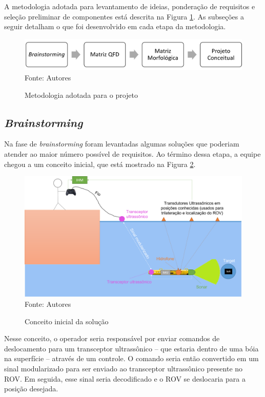 A metodologia adotada para levantamento de ideias, ponderação de requisitos e seleção preliminar de componentes está descrita na Figura \ref{fig:metodologia}. As subseções a seguir detalham o que foi desenvolvido em cada etapa da metodologia.

\begin{figure}[h]
	\centering
	\caption{Metodologia adotada para o projeto}
	\label{fig:metodologia}
	\includegraphics[width=0.7\linewidth]{images/metodologia}\\
	\footnotesize Fonte: Autores
\end{figure}

\subsection{\textit{Brainstorming}}
\label{subsec:brainstorming}

Na fase de \textit{brainstorming} foram levantadas algumas soluções que poderiam atender ao maior número possível de requisitos. Ao término dessa etapa, a equipe chegou a um conceito inicial, que está mostrado na Figura \ref{fig:conceito-inicial}.

\begin{figure}[h]
	\centering
	\caption{Conceito inicial da solução}
	\label{fig:conceito-inicial}
	\includegraphics[width=1\linewidth]{images/conceito-inicial}\\
	\footnotesize Fonte: Autores
\end{figure}

Nesse conceito, o operador seria responsável por enviar comandos de deslocamento para um transceptor ultrassônico -- que estaria dentro de uma bóia na superfície -- através de um controle. O comando seria então convertido em um sinal modularizado para ser enviado ao transceptor ultrassônico presente no ROV. Em seguida, esse sinal seria decodificado e o ROV se deslocaria para a posição desejada. 

